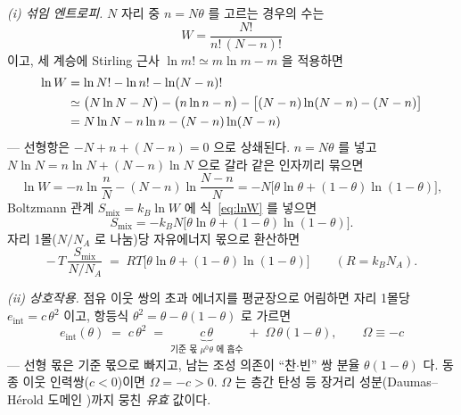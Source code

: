 \documentclass[11pt,a4paper]{article}
\begin{document}
\emph{(i) 섞임 엔트로피.} $N$ 자리 중 $n=N\theta$ 를 고르는 경우의 수는
\begin{equation}
W=\frac{N!}{n!\,(N-n)!}
\label{eq:W}
\end{equation}
이고, 세 계승에 Stirling 근사 $\ln m!\simeq m\ln m-m$ 을 적용하면
\begin{align}
\ln W&=\ln N!-\ln n!-\ln(N-n)!\notag\\
&\simeq\big(N\ln N-N\big)-\big(n\ln n-n\big)-\big[(N-n)\ln(N-n)-(N-n)\big]
\label{eq:stirlingexp}\\
&=N\ln N-n\ln n-(N-n)\ln(N-n)\notag
\end{align}
— 선형항은 $-N+n+(N-n)=0$ 으로 상쇄된다. $n=N\theta$ 를 넣고 $N\ln N=n\ln N+(N-n)\ln N$ 으로 갈라 같은 인자끼리 묶으면
\begin{equation}
\ln W=-n\ln\frac{n}{N}-(N-n)\ln\frac{N-n}{N}
=-N\big[\theta\ln\theta+(1-\theta)\ln(1-\theta)\big],
\label{eq:lnW}
\end{equation}
Boltzmann 관계 $S_{\mathrm{mix}}=k_B\ln W$ 에 식~\eqref{eq:lnW} 를 넣으면
\begin{equation}
S_{\mathrm{mix}}=-k_BN\big[\theta\ln\theta+(1-\theta)\ln(1-\theta)\big].
\label{eq:smix}
\end{equation}
자리 1몰($N/N_A$ 로 나눔)당 자유에너지 몫으로 환산하면
\begin{equation}
-\,T\,\frac{S_{\mathrm{mix}}}{N/N_A}
\;=\;RT\big[\theta\ln\theta+(1-\theta)\ln(1-\theta)\big]
\qquad(R=k_BN_A).
\label{eq:smixmol}
\end{equation}

\emph{(ii) 상호작용.} 점유 이웃 쌍의 초과 에너지를 평균장으로 어림하면 자리 1몰당 $e_{\mathrm{int}}=c\,\theta^2$ 이고, 항등식 $\theta^2=\theta-\theta(1-\theta)$ 로 가르면
\begin{equation}
e_{\mathrm{int}}(\theta)\;=\;c\,\theta^{2}
\;=\;\underbrace{c\,\theta}_{\text{기준 몫 }\mu^0\theta\text{ 에 흡수}}\;+\;\Omega\,\theta(1-\theta),
\qquad\Omega\equiv-c
\label{eq:meanfield}
\end{equation}
— 선형 몫은 기준 몫으로 빠지고, 남는 조성 의존이 ``찬$\cdot$빈'' 쌍 분율 $\theta(1-\theta)$ 다. 동종 이웃 인력쌍($c<0$)이면 $\Omega=-c>0$. $\Omega$ 는 층간 탄성 등 장거리 성분(Daumas--H\'erold 도메인 \cite{daumas1969,mckinnon1983})까지 뭉친 \emph{유효} 값이다.
\end{document}
